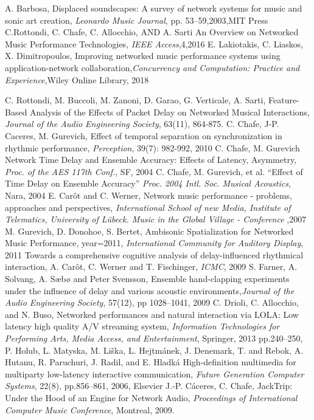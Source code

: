 A. Barbosa, Displaced soundscapes: A survey of network systems for music and sonic art creation,
\emph{Leonardo Music Journal},
pp. 53--59,2003,MIT Press
%
C.Rottondi, C. Chafe, C. Allocchio, AND A. Sarti
An Overview on Networked Music Performance Technologies, \emph{IEEE Access},4,2016
%
E. Lakiotakis, C. Liaskos, X. Dimitropoulos, Improving networked music performance systems using application-network collaboration,\emph{Concurrency and Computation: Practice and Experience},Wiley Online Library, 2018

C. Rottondi, M. Buccoli, M. Zanoni, D. Garao,  G. Verticale, A. Sarti,  Feature-Based Analysis of the Effects of Packet Delay on Networked Musical Interactions, \emph{Journal of the Audio Engineering Society}, 63(11), 864-875.
C. Chafe, J-P. Caceres, M. Gurevich, Effect of temporal separation on synchronization in rhythmic performance,
\emph{Perception}, 39(7): 982-992, 2010
%
C. Chafe, M. Gurevich Network Time Delay and Ensemble Accuracy: Effects of Latency, Asymmetry,
\emph{Proc. of the AES 117th Conf.}, SF, 2004
%
C. Chafe, M. Gurevich, et al. “Effect of Time Delay on Ensemble Accuracy”
\emph{Proc. 2004 Intl. Soc. Musical Acoustics}, Nara, 2004
E. Car\^ot and C. Werner, Network music performance - problems, approaches and perspectives,
\emph{International School of new Media, Institute of Telematics, University of Lübeck. Music in the Global Village - Conference}
,2007
%
M. Gurevich, D. Donohoe, S. Bertet,
Ambisonic Spatialization for Networked Music Performance,
year={2011},
\emph{International Community for Auditory Display}, 2011
Towards a comprehensive cognitive analysis of delay-influenced rhythmical interaction,
A. Car{\^o}t, C. Werner and T. Fischinger,
\emph{ICMC},
2009
%
S. Farner, A. Solvang, A. Sæbø and Peter Svensson, Ensemble hand-clapping experiments under
the influence of delay and various acoustic
environments,\emph{Journal of the Audio Engineering Society}, 57(12),
pp 1028--1041, 2009
C. Drioli, C. Allocchio, and N. Buso,
Networked performances and natural interaction via LOLA: Low latency high quality A/V streaming system,
\emph{Information Technologies for Performing Arts, Media Access, and Entertainment}, Springer, 2013
pp.240--250,
P. Holub, L. Matyska, M. Li{\v{s}}ka, L. Hejtm{\'a}nek, J. Denemark, T. and Rebok, A. Hutanu, R. Paruchuri, J. Radil, and E. Hladk{\'a}
High-definition multimedia for multiparty low-latency interactive communication,
\emph{Future Generation Computer Systems},
22(8),
pp.856--861,
2006,
Elsevier
J.-P. C\'{a}ceres, C. Chafe, JackTrip: Under the Hood of an Engine for Network Audio, \emph{Proceedings of International Computer Music Conference}, Montreal, 2009. 

